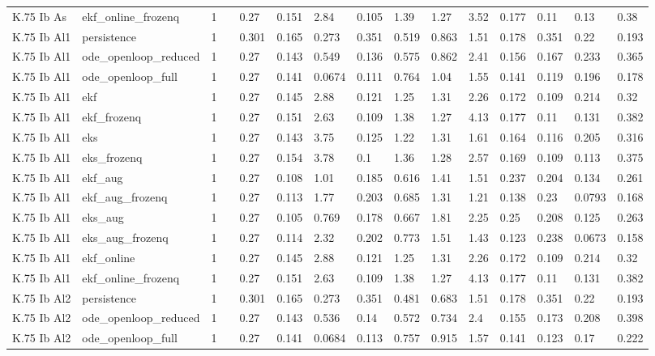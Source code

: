 \begin{table}[t]
\begin{tabular}{lllllllllllllll}
K.75 Ib As & ekf\_online\_frozenq & 1 &  & 0.27 & 0.151 & 2.84 & 0.105 & 1.39 & 1.27 & 3.52 & 0.177 & 0.11 & 0.13 & 0.38 \\
K.75 Ib Al1 & persistence & 1 &  & 0.301 & 0.165 & 0.273 & 0.351 & 0.519 & 0.863 & 1.51 & 0.178 & 0.351 & 0.22 & 0.193 \\
K.75 Ib Al1 & ode\_openloop\_reduced & 1 &  & 0.27 & 0.143 & 0.549 & 0.136 & 0.575 & 0.862 & 2.41 & 0.156 & 0.167 & 0.233 & 0.365 \\
K.75 Ib Al1 & ode\_openloop\_full & 1 &  & 0.27 & 0.141 & 0.0674 & 0.111 & 0.764 & 1.04 & 1.55 & 0.141 & 0.119 & 0.196 & 0.178 \\
K.75 Ib Al1 & ekf & 1 &  & 0.27 & 0.145 & 2.88 & 0.121 & 1.25 & 1.31 & 2.26 & 0.172 & 0.109 & 0.214 & 0.32 \\
K.75 Ib Al1 & ekf\_frozenq & 1 &  & 0.27 & 0.151 & 2.63 & 0.109 & 1.38 & 1.27 & 4.13 & 0.177 & 0.11 & 0.131 & 0.382 \\
K.75 Ib Al1 & eks & 1 &  & 0.27 & 0.143 & 3.75 & 0.125 & 1.22 & 1.31 & 1.61 & 0.164 & 0.116 & 0.205 & 0.316 \\
K.75 Ib Al1 & eks\_frozenq & 1 &  & 0.27 & 0.154 & 3.78 & 0.1 & 1.36 & 1.28 & 2.57 & 0.169 & 0.109 & 0.113 & 0.375 \\
K.75 Ib Al1 & ekf\_aug & 1 &  & 0.27 & 0.108 & 1.01 & 0.185 & 0.616 & 1.41 & 1.51 & 0.237 & 0.204 & 0.134 & 0.261 \\
K.75 Ib Al1 & ekf\_aug\_frozenq & 1 &  & 0.27 & 0.113 & 1.77 & 0.203 & 0.685 & 1.31 & 1.21 & 0.138 & 0.23 & 0.0793 & 0.168 \\
K.75 Ib Al1 & eks\_aug & 1 &  & 0.27 & 0.105 & 0.769 & 0.178 & 0.667 & 1.81 & 2.25 & 0.25 & 0.208 & 0.125 & 0.263 \\
K.75 Ib Al1 & eks\_aug\_frozenq & 1 &  & 0.27 & 0.114 & 2.32 & 0.202 & 0.773 & 1.51 & 1.43 & 0.123 & 0.238 & 0.0673 & 0.158 \\
K.75 Ib Al1 & ekf\_online & 1 &  & 0.27 & 0.145 & 2.88 & 0.121 & 1.25 & 1.31 & 2.26 & 0.172 & 0.109 & 0.214 & 0.32 \\
K.75 Ib Al1 & ekf\_online\_frozenq & 1 &  & 0.27 & 0.151 & 2.63 & 0.109 & 1.38 & 1.27 & 4.13 & 0.177 & 0.11 & 0.131 & 0.382 \\
K.75 Ib Al2 & persistence & 1 &  & 0.301 & 0.165 & 0.273 & 0.351 & 0.481 & 0.683 & 1.51 & 0.178 & 0.351 & 0.22 & 0.193 \\
K.75 Ib Al2 & ode\_openloop\_reduced & 1 &  & 0.27 & 0.143 & 0.536 & 0.14 & 0.572 & 0.734 & 2.4 & 0.155 & 0.173 & 0.208 & 0.398 \\
K.75 Ib Al2 & ode\_openloop\_full & 1 &  & 0.27 & 0.141 & 0.0684 & 0.113 & 0.757 & 0.915 & 1.57 & 0.141 & 0.123 & 0.17 & 0.222 \\

\end{tabular}
\end{table}
